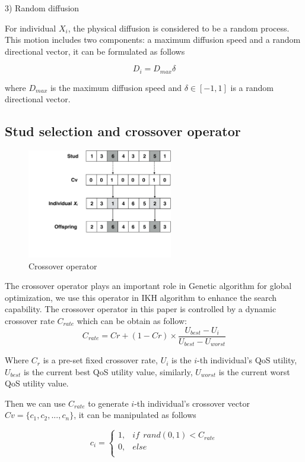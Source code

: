 \documentclass[10pt,journal,compsoc]{IEEEtran}
\begin{document}
3) Random diffusion

For individual $X_i$, the physical diffusion is considered to be a random process. This motion includes two components: a maximum diffusion speed and a random directional vector, it can be formulated as follows

\begin{equation}
D_i = D_{max}\delta
\end{equation}

where $D_{max}$ is the maximum diffusion speed and $\delta \in [-1, 1]$ is a random directional vector.

\subsection{Stud selection and crossover operator}

\begin{figure}[!t]
\centering
\includegraphics[width=2.5in]{./img/pic5.pdf}
\caption{Crossover operator}
\label{fig_opportunistic}
\end{figure}


The crossover operator plays an important role in Genetic algorithm for global optimization, we use this operator in IKH algorithm to enhance the search capability. The crossover operator in this paper is controlled by a dynamic crossover rate $C_{rate}$ which can be obtain as follow:
\begin{equation}
C_{rate} = Cr + (1-Cr) \times \frac{U_{best}-U_{i}}{U_{best}-U_{worst}}
\end{equation}

Where $C_r$ is a pre-set fixed crossover rate, $U_{i}$ is the $i$-th individual's QoS utility, $U_{best}$ is the current best QoS utility value, similarly, $U_{worst}$ is the current worst QoS utility value. 

Then we can use $C_{rate}$ to generate $i$-th individual's crossover vector $Cv = \{c_{1},c_{2},...,c_{n}\}$, it can be manipulated as follows

\begin{equation}
c_{i}=
\begin{cases}
1,& if \ \ rand(0,1) < C_{rate}\\
0,& else\\
\end{cases}
\end{equation}
\end{document}
